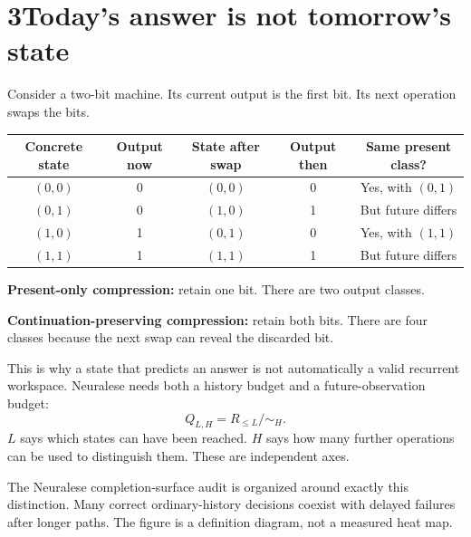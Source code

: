 \documentclass[11pt]{article}
\begin{document}
\section*{3\quad Today's answer is not tomorrow's state}
Consider a two-bit machine. Its current output is the first bit. Its next operation swaps the bits.
\begin{center}
\begin{tabular}{ccccc}
\toprule Concrete state & Output now & State after swap & Output then & Same present class?\\\midrule
$(0,0)$ & 0 & $(0,0)$ & 0 & Yes, with $(0,1)$\\
$(0,1)$ & 0 & $(1,0)$ & 1 & But future differs\\
$(1,0)$ & 1 & $(0,1)$ & 0 & Yes, with $(1,1)$\\
$(1,1)$ & 1 & $(1,1)$ & 1 & But future differs\\\bottomrule
\end{tabular}
\end{center}
\textbf{Present-only compression:} retain one bit. There are two output classes.

\textbf{Continuation-preserving compression:} retain both bits. There are four classes because the next swap can reveal the discarded bit.

This is why a state that predicts an answer is not automatically a valid recurrent workspace. Neuralese needs both a history budget and a future-observation budget:
\[
 Q_{L,H}=R_{\le L}/\!\sim_H.
\]
$L$ says which states can have been reached. $H$ says how many further operations can be used to distinguish them. These are independent axes.

\begin{center}
\end{center}
The Neuralese completion-surface audit is organized around exactly this distinction. Many correct ordinary-history decisions coexist with delayed failures after longer paths. The figure is a definition diagram, not a measured heat map.
\clearpage
\end{document}
